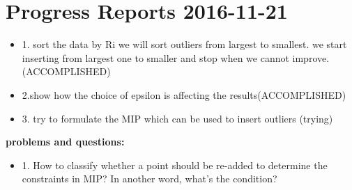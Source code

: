 \documentclass[]{article}
\begin{document}
\section{Progress Reports 2016-11-21}




\begin{itemize}
\item 1.  sort the data by Ri we will sort outliers from largest to smallest.
we start inserting from largest one to smaller and stop when we cannot improve. (ACCOMPLISHED)

\item 2.show how the choice of epsilon is affecting the results(ACCOMPLISHED)

\item 3. try to formulate the MIP which can be used to insert outliers (trying)


\end{itemize}
{\bf problems and questions:}
\begin{itemize}
\item 1. How to classify whether a point should be re-added to determine the constraints in MIP? In another word, what's the condition?


\end{itemize}
\end{document}
